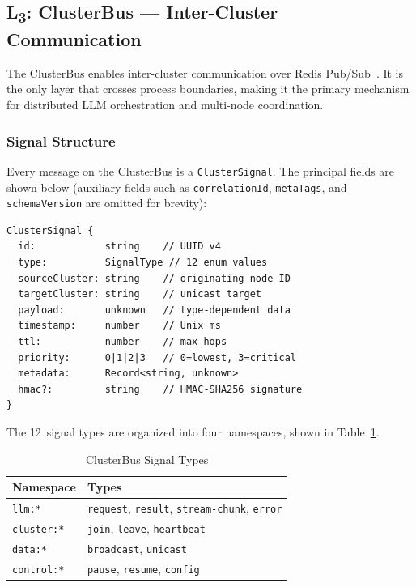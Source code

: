 \documentclass[journal,10pt]{IEEEtran}
\newcommand{\code}[1]{\texttt{#1}}
\newcommand{\layerthree}{L\textsubscript{3}}
\begin{document}
\subsection{\layerthree: ClusterBus --- Inter-Cluster Communication}
\label{sec:l3}

The ClusterBus enables inter-cluster communication over Redis Pub/Sub~\cite{redis}. It is the only layer that crosses process boundaries, making it the primary mechanism for distributed LLM orchestration and multi-node coordination.

\subsubsection{Signal Structure}

Every message on the ClusterBus is a \code{ClusterSignal}. The principal fields are shown below (auxiliary fields such as \code{correlationId}, \code{metaTags}, and \code{schemaVersion} are omitted for brevity):

\begin{lstlisting}[language={}]
ClusterSignal {
  id:            string    // UUID v4
  type:          SignalType // 12 enum values
  sourceCluster: string    // originating node ID
  targetCluster: string    // unicast target
  payload:       unknown   // type-dependent data
  timestamp:     number    // Unix ms
  ttl:           number    // max hops
  priority:      0|1|2|3   // 0=lowest, 3=critical
  metadata:      Record<string, unknown>
  hmac?:         string    // HMAC-SHA256 signature
}
\end{lstlisting}

The 12~signal types are organized into four namespaces, shown in Table~\ref{tab:signals}.

\begin{table}[!t]
\centering
\caption{ClusterBus Signal Types}
\label{tab:signals}
\begin{tabular}{@{}lp{45mm}@{}}
\toprule
\textbf{Namespace} & \textbf{Types} \\
\midrule
\code{llm:*}     & \code{request}, \code{result}, \code{stream-chunk}, \code{error} \\
\code{cluster:*} & \code{join}, \code{leave}, \code{heartbeat} \\
\code{data:*}    & \code{broadcast}, \code{unicast} \\
\code{control:*} & \code{pause}, \code{resume}, \code{config} \\
\bottomrule
\end{tabular}
\end{table}
\end{document}

